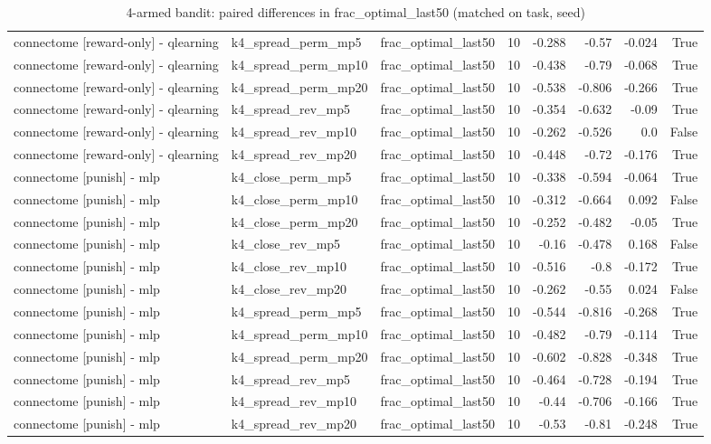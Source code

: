 \begin{table}[t]
\begin{tabular}{lllrrrrr}
connectome [reward-only] - qlearning & k4\_spread\_perm\_mp5 & frac\_optimal\_last50 & 10 & -0.288 & -0.57 & -0.024 & True \\
connectome [reward-only] - qlearning & k4\_spread\_perm\_mp10 & frac\_optimal\_last50 & 10 & -0.438 & -0.79 & -0.068 & True \\
connectome [reward-only] - qlearning & k4\_spread\_perm\_mp20 & frac\_optimal\_last50 & 10 & -0.538 & -0.806 & -0.266 & True \\
connectome [reward-only] - qlearning & k4\_spread\_rev\_mp5 & frac\_optimal\_last50 & 10 & -0.354 & -0.632 & -0.09 & True \\
connectome [reward-only] - qlearning & k4\_spread\_rev\_mp10 & frac\_optimal\_last50 & 10 & -0.262 & -0.526 & 0.0 & False \\
connectome [reward-only] - qlearning & k4\_spread\_rev\_mp20 & frac\_optimal\_last50 & 10 & -0.448 & -0.72 & -0.176 & True \\
connectome [punish] - mlp & k4\_close\_perm\_mp5 & frac\_optimal\_last50 & 10 & -0.338 & -0.594 & -0.064 & True \\
connectome [punish] - mlp & k4\_close\_perm\_mp10 & frac\_optimal\_last50 & 10 & -0.312 & -0.664 & 0.092 & False \\
connectome [punish] - mlp & k4\_close\_perm\_mp20 & frac\_optimal\_last50 & 10 & -0.252 & -0.482 & -0.05 & True \\
connectome [punish] - mlp & k4\_close\_rev\_mp5 & frac\_optimal\_last50 & 10 & -0.16 & -0.478 & 0.168 & False \\
connectome [punish] - mlp & k4\_close\_rev\_mp10 & frac\_optimal\_last50 & 10 & -0.516 & -0.8 & -0.172 & True \\
connectome [punish] - mlp & k4\_close\_rev\_mp20 & frac\_optimal\_last50 & 10 & -0.262 & -0.55 & 0.024 & False \\
connectome [punish] - mlp & k4\_spread\_perm\_mp5 & frac\_optimal\_last50 & 10 & -0.544 & -0.816 & -0.268 & True \\
connectome [punish] - mlp & k4\_spread\_perm\_mp10 & frac\_optimal\_last50 & 10 & -0.482 & -0.79 & -0.114 & True \\
connectome [punish] - mlp & k4\_spread\_perm\_mp20 & frac\_optimal\_last50 & 10 & -0.602 & -0.828 & -0.348 & True \\
connectome [punish] - mlp & k4\_spread\_rev\_mp5 & frac\_optimal\_last50 & 10 & -0.464 & -0.728 & -0.194 & True \\
connectome [punish] - mlp & k4\_spread\_rev\_mp10 & frac\_optimal\_last50 & 10 & -0.44 & -0.706 & -0.166 & True \\
connectome [punish] - mlp & k4\_spread\_rev\_mp20 & frac\_optimal\_last50 & 10 & -0.53 & -0.81 & -0.248 & True \\
\bottomrule
\end{tabular}
\caption{4-armed bandit: paired differences in frac\_optimal\_last50 (matched on task, seed)}
\label{tab:bandit_punish_paired_frac_optimal_last50}
\end{table}